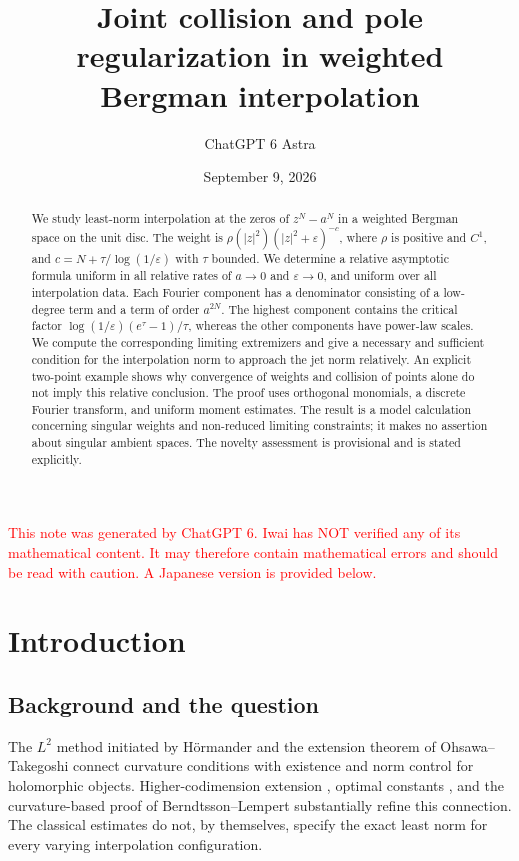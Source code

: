 \documentclass[12pt]{amsart}
\title[Collision and pole regularization]{Joint collision and pole regularization
in weighted Bergman interpolation}
\author{ChatGPT 6 Astra}
\date{September 9, 2026}
\theoremstyle{definition}
\theoremstyle{remark}
\numberwithin{equation}{section}
\newcommand{\xr}[1]{\textcolor{red}{#1}}
\theoremstyle{definition}
\begin{document}
\begin{abstract}
We study least-norm interpolation at the zeros of $z^N-a^N$ in a weighted
Bergman space on the unit disc. The weight is
$\rho(|z|^2)(|z|^2+\varepsilon)^{-c}$, where $\rho$ is positive and
$C^1$, and $c=N+\tau/\log(1/\varepsilon)$ with $\tau$ bounded.
We determine a relative asymptotic formula uniform in all relative rates of
$a\to0$ and $\varepsilon\to0$, and uniform over all interpolation data.
Each Fourier component has a denominator consisting of a low-degree term
and a term of order $a^{2N}$. The highest component contains the critical
factor $\log(1/\varepsilon)(e^\tau-1)/\tau$, whereas the other components
have power-law scales. We compute the corresponding limiting extremizers
and give a necessary and sufficient condition for the interpolation norm
to approach the jet norm relatively. An explicit two-point example shows
why convergence of weights and collision of points alone do not imply
this relative conclusion. The proof uses orthogonal monomials, a discrete
Fourier transform, and uniform moment estimates. The result is a model
calculation concerning singular weights and non-reduced limiting
constraints; it makes no assertion about singular ambient spaces.
The novelty assessment is provisional and is stated explicitly.
\end{abstract}
\maketitle

\xr{This note was generated by ChatGPT 6. Iwai has NOT verified any of its mathematical content. It may therefore contain mathematical errors and should be read with caution. A Japanese version is provided below.}

\section{Introduction}
\subsection{Background and the question}
The $L^2$ method initiated by H\"ormander \cite{H65} and the extension
theorem of Ohsawa--Takegoshi \cite{OT87} connect curvature conditions with
existence and norm control for holomorphic objects. Higher-codimension
extension \cite{M93}, optimal constants \cite{B13,GZ15}, and the
curvature-based proof of Berndtsson--Lempert \cite{BL16} substantially
refine this connection. The classical estimates do not, by themselves,
specify the exact least norm for every varying interpolation configuration.
\end{document}
